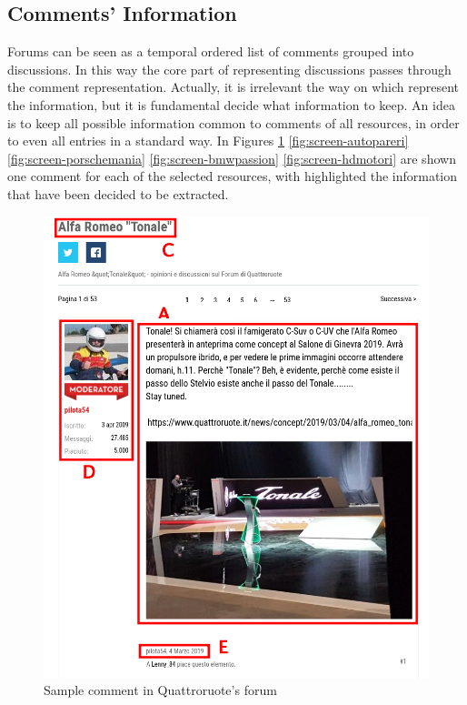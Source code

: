 \subsection{Comments' Information}

Forums can be seen as a temporal ordered list of comments grouped into discussions. In this way the core part of representing discussions passes through the comment representation. Actually, it is irrelevant the way on which represent the information, but it is fundamental decide what information to keep. An idea is to keep all possible information common to comments of all resources, in order to even all entries in a standard way. In Figures \ref{fig:screen-quattroruote} \ref{fig:screen-autopareri} \ref{fig:screen-porschemania} \ref{fig:screen-bmwpassion} \ref{fig:screen-hdmotori} are shown one comment for each of the selected resources, with highlighted the information that have been decided to be extracted.

\begin{figure}[!hb]
	\centering
	\includegraphics[width=1\textwidth]{figures/screen/screen-quattroruote.png}
	\caption{Sample comment in Quattroruote's forum}
	\label{fig:screen-quattroruote}
\end{figure}

